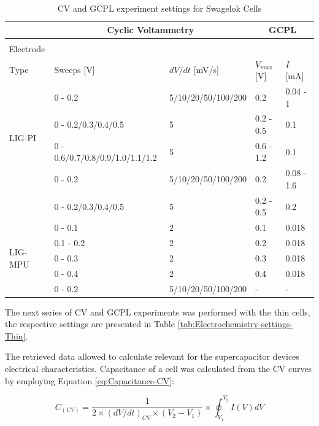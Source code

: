 \begin{table}[H]
\centering
    \caption{CV and GCPL experiment settings for Swagelok Cells}
    \label{tab:Electrochemistry-settings-Sw} 
\medskip
\medskip
\begin{tabular}{l|l|l||l|l}
\hline
  &
\multicolumn{2}{c||}{Cyclic Voltammetry} &
\multicolumn{2}{c}{GCPL} \\
\hline
\pbox{100px}{.\\Electrode\\Type} & Sweeps [V] & $dV/dt$ [mV/s] & $V_{max}$ [V] & $I$ [mA] \\[13px]
\hline
\multirow{4}{*}{LIG-PI} & 0 - 0.2 & 5/10/20/50/100/200 & 0.2 & 0.04 - 1 \\[13px]
   &0 - 0.2/0.3/0.4/0.5 & 5 & 0.2 - 0.5 & 0.1 \\[13px]
   &0 - 0.6/0.7/0.8/0.9/1.0/1.1/1.2 & 5 & 0.6 - 1.2 & 0.1 \\[13px]
\hline
\multirow{4}{*}{LIG-PDMS} & 0 - 0.2 & 5/10/20/50/100/200 & 0.2 & 0.08 - 1.6 \\[13px]
    &0 - 0.2/0.3/0.4/0.5 & 5 & 0.2 - 0.5 & 0.2 \\[13px]
\hline
\multirow{5}{*}{LIG-MPU} & 0 - 0.1 & 2 & 0.1 & 0.018 \\[13px]
    &0.1 - 0.2 & 2 & 0.2 & 0.018 \\[13px]
    &0 - 0.3 & 2 & 0.3 & 0.018 \\[13px]
    &0 - 0.4 & 2 & 0.4 & 0.018 \\[13px]
    & 0 - 0.2\footnotemark[1] & 5/10/20/50/100/200 & - & -\\[13px]
\hline

\end{tabular}
\end{table}



The next series of CV and GCPL experiments was performed with the thin cells, the respective settings are presented in Table \ref{tab:Electrochemistry-settings-Thin}.

The retrieved data allowed to calculate relevant for the supercapacitor devices electrical characteristics. Capacitance of a cell was calculated from the CV curves by employing Equation \ref{eq:Capacitance-CV}:

\begin{equation}
\label{eq:Capacitance-CV}
C_{(CV)} = \frac{1}{2\times (dV/dt)_{CV} \times(V_2-V_1)}\times \oint_{V_1}^{V_2} I(V) dV
\end{equation}

